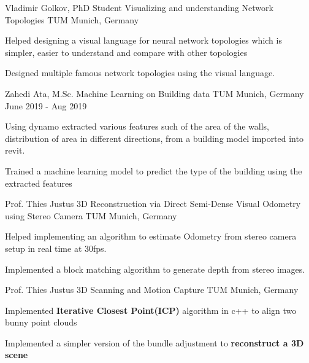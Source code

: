 \begin{cventries}
	\cventry
	{Vladimir Golkov, PhD Student} %
	{Visualizing and understanding Network Topologies} %
	{TUM Munich, Germany} %
	{} %
	{
		\begin{cvitems} %
			\item {Helped designing a visual language for neural network topologies which is simpler, easier to understand and compare with other topologies}
			\item {Designed multiple famous network topologies using the visual language.}
		\end{cvitems}
	}
	
	\cventry
	{Zahedi Ata, M.Sc.} %
	{Machine Learning on Building data} %
	{TUM Munich, Germany} %
	{June 2019 - Aug 2019} %
	{
		\begin{cvitems} %
			\item {Using dynamo extracted various features such of the area of the walls, distribution of area in different directions, from a building model imported into revit.} 
			\item {Trained a machine learning model to predict the type of the building using the extracted features}
		\end{cvitems}
	}

  	\cventry
    {Prof. Thies Justus} %
    {3D Reconstruction via Direct Semi-Dense Visual Odometry using Stereo Camera} %
    {TUM Munich, Germany} %
    {} %
    {
      \begin{cvitems} %
      	\item {Helped implementing an algorithm to estimate Odometry from stereo camera setup in real time at 30fps.}
		\item {Implemented a block matching algorithm to generate depth from stereo images.}
      \end{cvitems}
    }

	\cventry
	{Prof. Thies Justus} %
	{3D Scanning and Motion Capture} %
	{TUM Munich, Germany} %
	{} %
	{
		\begin{cvitems} %
			\item {Implemented \textbf{Iterative Closest Point(ICP)} algorithm in c++ to align two bunny point clouds}
			\item {Implemented a simpler version of the bundle adjustment to \textbf{reconstruct a 3D scene}}
		\end{cvitems}
	}


\end{cventries}
